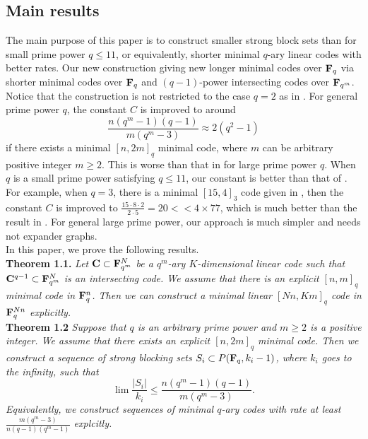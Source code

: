 \documentclass[10pt,a4paper]{article}
\begin{document}
\subsection{Main results}





The main purpose of this paper is to construct smaller strong block sets than \cite{Alon} for small prime power $q \leq 11$, or equivalently, shorter minimal $q$-ary linear codes with better rates. Our new construction giving new longer minimal codes over ${\bf F}_q$ via shorter minimal codes over ${\bf F}_q$ and $(q-1)$-power intersecting codes over ${\bf F}_{q^m}$. Notice that the construction is not restricted to the case $q=2$ as in \cite{Borello}. For general prime power $q$, the constant $C$ is improved to around $$\frac{n(q^m-1)(q-1)}{m(q^m-3)}\approx 2(q^2-1)$$ if there exists a minimal $[n,2m]_q$ minimal code, where $m$ can be arbitrary positive integer $m \geq 2$. This is worse than that in \cite{Alon} for large prime power $q$. When $q$ is a small prime power satisfying $q\leq 11$, our constant is better than that of \cite{Alon}. For example, when $q=3$, there is a minimal $[15,4]_3$ code given in \cite[Page11]{Kurz}, then the constant $C$ is improved to $\frac{15 \cdot 8 \cdot 2}{2 \cdot 5}=20 << 4 \times 77$, which is much better than the result in \cite[Table 3]{Alon}. For general large prime power, our approach is much simpler and needs not expander graphs.\\


In this paper, we prove the following results.\\

{\bf Theorem 1.1.} {\em Let ${\bf C} \subset {\bf F}_{q^m}^N$ be a $q^m$-ary $K$-dimensional linear code such that ${\bf C}^{q-1}\subset {\bf F}_{q^m}^N$ is an intersecting code. We assume that there is an explicit $[n,m]_q$ minimal code in ${\bf F}_q^n$. Then we can construct a minimal linear $[Nn,Km]_q$ code in ${\bf F}_q^{Nn}$ explicitly.}\\


{\bf Theorem 1.2} {\em Suppose that $q$ is an arbitrary prime power and $m \geq 2$ is a positive integer. We assume that there exists an explicit $[n,2m]_q$ minimal code. Then we construct a sequence of strong blocking sets $S_i \subset P({\bf F}_q, k_i-1)$, where $k_i$ goes to the infinity, such that $$\lim\frac{|S_i|}{k_i}\leq \frac{n(q^m-1)(q-1)}{m(q^m-3)}.$$ Equivalently, we construct sequences of minimal $q$-ary codes with rate at least $\frac{m(q^m-3)}{n(q-1)(q^m-1)}$ explcitly.}\\
\end{document}
